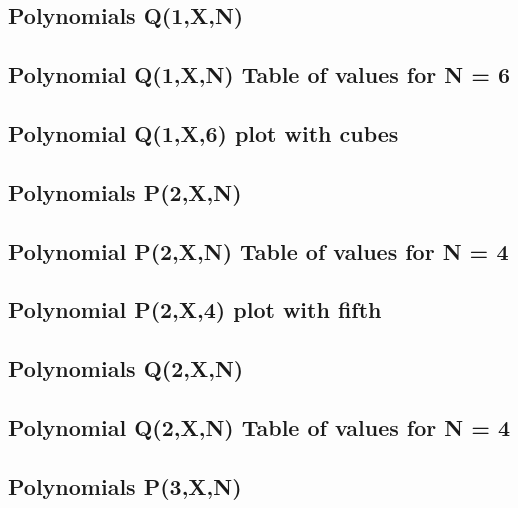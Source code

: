 \documentclass[12pt,letterpaper,oneside,reqno]{amsart}
\begin{document}
    \subsection{Polynomials Q(1,X,N)}
    

    \subsection{Polynomial Q(1,X,N) Table of values for N = 6}
    

    \subsection{Polynomial Q(1,X,6) plot with cubes}
    

    \subsection{Polynomials P(2,X,N)}
    

    \subsection{Polynomial P(2,X,N) Table of values for N = 4}
    

    \subsection{Polynomial P(2,X,4) plot with fifth}
    

    \subsection{Polynomials Q(2,X,N)}
    

    \subsection{Polynomial Q(2,X,N) Table of values for N = 4}
    

    \subsection{Polynomials P(3,X,N)}
    
\end{document}
